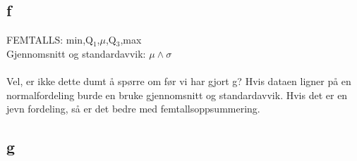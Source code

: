 \subsection*{f}

FEMTALLS: min,Q$_1$,$\mu$,Q$_3$,max
\\
Gjennomsnitt og standardavvik: $\mu \land \sigma$
\\
\\
Vel, er ikke dette dumt å spørre om før vi har gjort g? Hvis dataen ligner på en normalfordeling burde en bruke gjennomsnitt og standardavvik. Hvis det er en jevn fordeling, så er det bedre med femtallsoppsummering. 

\subsection*{g}

